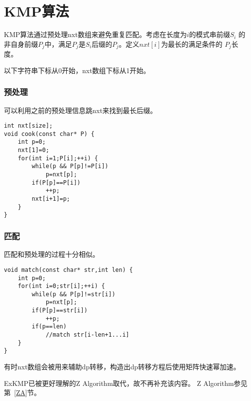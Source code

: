 \section{KMP算法}

KMP算法通过预处理nxt数组来避免重复匹配。考虑在长度为$i$的模式串前缀$S_i$
的非自身前缀$P_j$中，满足$P_j$是$S_i$后缀的$P_j$。定义$nxt[i]$为最长的满足条件的
$P_j$长度。

以下字符串下标从0开始，nxt数组下标从1开始。
\subsubsection{预处理}
可以利用之前的预处理信息跳nxt来找到最长后缀。
\begin{lstlisting}
int nxt[size];
void cook(const char* P) {
    int p=0;
    nxt[1]=0;
    for(int i=1;P[i];++i) {
        while(p && P[p]!=P[i])
            p=nxt[p];
        if(P[p]==P[i])
            ++p;
        nxt[i+1]=p;
    }
}
\end{lstlisting}
\subsubsection{匹配}
匹配和预处理的过程十分相似。
\begin{lstlisting}
void match(const char* str,int len) {
    int p=0;
    for(int i=0;str[i];++i) {
        while(p && P[p]!=str[i])
            p=nxt[p];
        if(P[p]==str[i])
            ++p;
        if(p==len)
            //match str[i-len+1...i]
    }
}
\end{lstlisting}

有时nxt数组会被用来辅助dp转移，构造出dp转移方程后使用矩阵快速幂加速。

ExKMP已被更好理解的Z Algorithm取代，故不再补充该内容。
Z Algorithm参见第~\ref{ZA}节。
